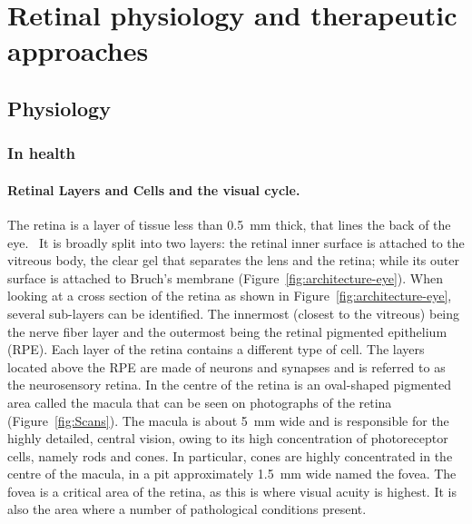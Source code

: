 \documentclass[12pt,a4paper]{journal}
\begin{document}
\section*{Retinal physiology and therapeutic approaches}

\subsection*{Physiology}

\subsubsection*{In health}

\paragraph*{Retinal Layers and Cells and the visual cycle.}

The retina is a layer of tissue less than \SI{0.5}{\mm} thick, that lines the back of the eye.~\cite{Gupta_2015}
It is broadly split into two layers: the retinal inner surface is attached to the vitreous body, the clear gel that separates the lens and the retina; while its outer surface is attached to Bruch's membrane (Figure~\ref{fig:architecture-eye}).
When looking at a cross section of the retina as shown in Figure~\ref{fig:architecture-eye}, several sub-layers can be identified. The innermost (closest to the vitreous) being the nerve fiber layer and the outermost being the retinal pigmented epithelium (RPE).
Each layer of the retina contains a different type of cell.
The layers located above the RPE are made of neurons and synapses and is referred to as the neurosensory retina.
In the centre of the retina is an oval-shaped pigmented area called the macula that can be seen on photographs of the retina (Figure~\ref{fig:Scans}).
The macula is about \SI{5}{\mm} wide and is responsible for the highly detailed, central vision, owing to its high concentration of photoreceptor cells, namely rods and cones.
In particular, cones are highly concentrated in the centre of the macula, in a pit approximately \SI{1.5}{\mm} wide named the fovea.
The fovea is a critical area of the retina, as this is where visual acuity is highest.
It is also the area where a number of pathological conditions present.
\end{document}
